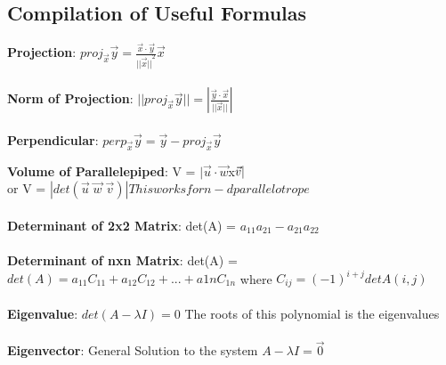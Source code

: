 \documentclass[12pt]{article}
\newcommand{\vectorproj}[2][]{\textit{proj}_{\vec{#1}}\vec{#2}}
\newcommand{\vectorperp}[2][]{\textit{perp}_{\vec{#1}}\vec{#2}}
\begin{document}
\newpage
\begin{appendices}
\appendix 
\section{Compilation of Useful Formulas}
\label{appendix:Formula}
\textbf{Projection}: $\vectorproj[x]{y} = \frac{\vec{x}\cdot\vec{y}}{{||\vec{x}||}^2}\vec{x}$\\\\

\textbf{Norm of Projection}: $||\vectorproj[x]{y}|| = |\frac{\vec{y}\cdot\vec{x}}{||\vec{x}||}|$\\\\

\textbf{Perpendicular}: $\vectorperp[x]{y} = \vec{y} - \vectorproj[x]{y}$

\textbf{Volume of Parallelepiped}: V = $|\vec{u}\cdot\vec{w}$x$\vec{v}|\\$\\
or V = $|det(\vec{u}\;\vec{w}\; \vec{v})| This works for n-d parallelotrope$\\\\

\textbf{Determinant of 2x2 Matrix}: det(A) = $a_{11}a_{21} - a_{21}a_{22}$\\\\

\textbf{Determinant of nxn Matrix}: det(A) = $det(A) = a_{11}C_{11} + a_{12}C_{12}+...+a{1n}C_{1n}$ where $C_{ij} = (-1)^{i+j}detA(i,j)$\\\\

\textbf{Eigenvalue}: $det(A-\lambda I) = 0$ The roots of this polynomial is the eigenvalues\\\\

\textbf{Eigenvector}: General Solution to the system $A-\lambda I = \vec{0}$\\\\

\thispagestyle{empty}
\end{appendices}

 
\end{document}
